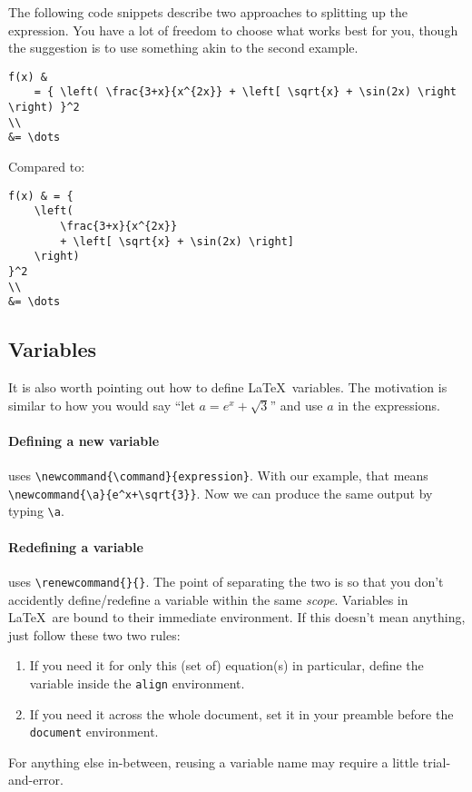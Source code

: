 The following code snippets describe two approaches to splitting up the expression.
You have a lot of freedom to choose what works best for you, though the suggestion is to use something akin to the second example.
\begin{lstlisting}
f(x) &
    = { \left( \frac{3+x}{x^{2x}} + \left[ \sqrt{x} + \sin(2x) \right \right) }^2
\\
&= \dots
\end{lstlisting}
Compared to:
\begin{lstlisting}
f(x) & = {
    \left( 
        \frac{3+x}{x^{2x}}
        + \left[ \sqrt{x} + \sin(2x) \right]
    \right)
}^2
\\
&= \dots
\end{lstlisting}

\subsection{Variables}
It is also worth pointing out how to define \LaTeX\ variables.
The motivation is similar to how you would say ``let \(a = e^x+\sqrt{3}\)'' and use \(a\) in the expressions.

\paragraph{Defining a new variable} uses \verb|\newcommand{\command}{expression}|.
With our example, that means \verb|\newcommand{\a}{e^x+\sqrt{3}}|.
Now we can produce the same output by typing \verb|\a|.

\paragraph{Redefining a variable} uses \verb|\renewcommand{}{}|. The point of separating the two is so that you don't accidently define/redefine a variable within the same \emph{scope}.
Variables in \LaTeX\ are bound to their immediate environment.
If this doesn't mean anything, just follow these two two rules:
\begin{enumerate}
    \item If you need it for only this (set of) equation(s) in particular, define the variable inside the \verb|align| environment.
    \item If you need it across the whole document, set it in your preamble before the \texttt{document} environment.
\end{enumerate}

For anything else in-between, reusing a variable name may require a little trial-and-error.


